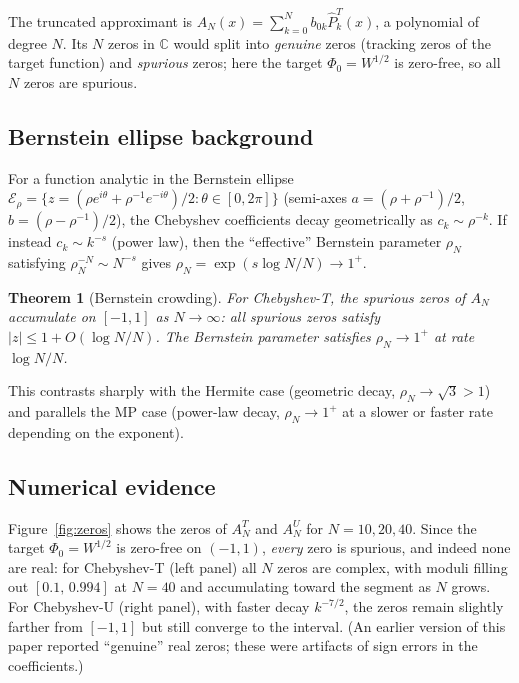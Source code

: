 \documentclass[11pt,a4paper]{article}
\newtheorem{theorem}{Theorem}[section]
\newcommand{\C}{\mathbb{C}}
\begin{document}
The truncated approximant is
$A_N(x)=\sum_{k=0}^N b_{0k}\widehat P_k^T(x)$,
a polynomial of degree $N$.
Its $N$ zeros in $\C$ would split into \emph{genuine} zeros (tracking zeros of
the target function) and \emph{spurious} zeros; here the target
$\Phi_0=W^{1/2}$ is zero-free, so all $N$ zeros are spurious.

\subsection{Bernstein ellipse background}

For a function analytic in the Bernstein ellipse
$\mathcal{E}_\rho=\{z=(\rho e^{i\theta}+\rho^{-1}e^{-i\theta})/2:\theta\in[0,2\pi]\}$
(semi-axes $a=(\rho+\rho^{-1})/2$, $b=(\rho-\rho^{-1})/2$),
the Chebyshev coefficients decay geometrically as $c_k\sim\rho^{-k}$.
If instead $c_k\sim k^{-s}$ (power law), then the ``effective'' Bernstein parameter
$\rho_N$ satisfying $\rho_N^{-N}\sim N^{-s}$ gives $\rho_N=\exp(s\log N/N)\to1^+$.

\begin{theorem}[Bernstein crowding]\label{thm:bernstein}
  For Chebyshev-T, the spurious zeros of $A_N$ accumulate on $[-1,1]$ as $N\to\infty$:
  all spurious zeros satisfy $|z|\le 1+O(\log N/N)$.
  The Bernstein parameter satisfies $\rho_N\to1^+$ at rate $\log N/N$.
\end{theorem}

\noindent This contrasts sharply with the Hermite case (geometric decay,
$\rho_N\to\sqrt{3}>1$) and parallels the MP case (power-law decay, $\rho_N\to1^+$
at a slower or faster rate depending on the exponent).

\subsection{Numerical evidence}

Figure~\ref{fig:zeros} shows the zeros of $A_N^T$ and $A_N^U$ for $N=10,20,40$.
Since the target $\Phi_0=W^{1/2}$ is zero-free on $(-1,1)$, \emph{every} zero
is spurious, and indeed none are real: for Chebyshev-T (left panel) all $N$
zeros are complex, with moduli filling out $[0.1,\,0.994]$ at $N=40$ and
accumulating toward the segment as $N$ grows.
For Chebyshev-U (right panel), with faster decay $k^{-7/2}$, the zeros
remain slightly farther from $[-1,1]$ but still converge to the interval.
(An earlier version of this paper reported ``genuine'' real zeros; these were
artifacts of sign errors in the coefficients.)
\end{document}
